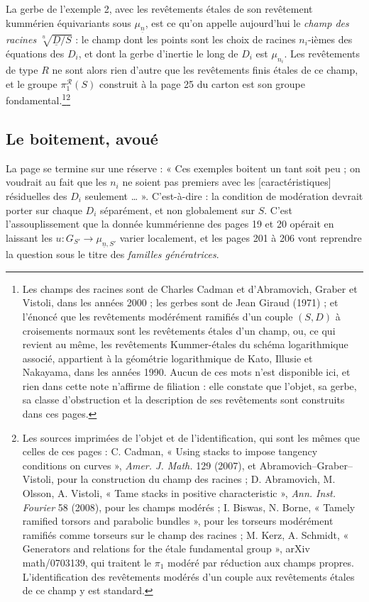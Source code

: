 \documentclass[11pt,a4paper]{article}
\begin{document}
La gerbe de l'exemple 2, avec les revêtements étales de son revêtement
kummérien équivariants sous $\mu_{\underline{n}}$, est ce qu'on appelle
aujourd'hui le \emph{champ des racines}
$\sqrt[\underline{n}]{\underline{D}/S}$ : le champ dont les points sont les
choix de racines $n_{i}$-ièmes des équations des $D_{i}$, et dont la gerbe
d'inertie le long de $D_{i}$ est $\mu_{n_{i}}$. Les revêtements de type $R$ ne
sont alors rien d'autre que les revêtements finis étales de ce champ, et le
groupe $\pi_{1}^{\mathcal{R}}(S)$ construit à la page 25 du carton est son
groupe fondamental.\footnote{Les champs des racines sont de Charles Cadman et
d'Abramovich, Graber et Vistoli, dans les années 2000 ; les gerbes sont de Jean
Giraud (1971) ; et l'énoncé que les revêtements modérément ramifiés d'un couple
$(S, D)$ à croisements normaux sont les revêtements étales d'un champ, ou,
ce qui revient au même, les revêtements Kummer-étales du schéma
logarithmique associé, appartient à la géométrie logarithmique de Kato, Illusie
et Nakayama, dans les années 1990. Aucun de ces mots n'est disponible ici, et
rien dans cette note n'affirme de filiation : elle constate que l'objet, sa
gerbe, sa classe d'obstruction et la description de ses revêtements sont
construits dans ces pages.}\footnote{Les sources imprimées de l'objet et de
l'identification, qui sont les mêmes que celles de ces pages : C. Cadman,
« Using stacks to impose tangency conditions on curves », \emph{Amer. J.
Math.} 129 (2007), et Abramovich--Graber--Vistoli, pour la construction du
champ des racines ; D. Abramovich, M. Olsson, A. Vistoli, « Tame stacks in
positive characteristic », \emph{Ann. Inst. Fourier} 58 (2008), pour les
champs modérés ; I. Biswas, N. Borne, « Tamely ramified torsors and parabolic
bundles », pour les torseurs modérément ramifiés comme torseurs sur le champ
des racines ; M. Kerz, A. Schmidt, « Generators and relations for the étale
fundamental group », arXiv math/0703139, qui traitent le $\pi_1$ modéré par
réduction aux champs propres. L'identification des revêtements modérés d'un
couple aux revêtements étales de ce champ y est standard.}

\subsection*{Le boitement, avoué}

La page se termine sur une réserve : « Ces exemples boitent un tant soit peu ;
on voudrait au fait que les $n_{i}$ ne soient pas premiers avec les
[caractéristiques] résiduelles des $D_{i}$ seulement … ». C'est-à-dire :
la condition de modération devrait porter sur chaque $D_{i}$ séparément, et non
globalement sur $S$. C'est l'assouplissement que la donnée kummérienne des
pages 19 et 20 opérait en laissant les $u : G_{S'} \to
\mu_{\underline{n},S'}$ varier localement, et les pages 201 à 206 vont
reprendre la question sous le titre des \emph{familles génératrices}.
\end{document}
